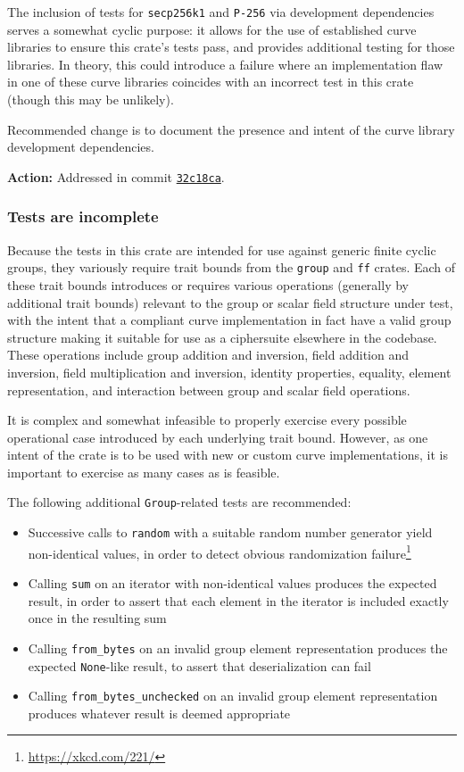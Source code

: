 \documentclass{article}
\begin{document}
The inclusion of tests for \texttt{secp256k1} and \texttt{P-256} via development dependencies serves a somewhat cyclic purpose: it allows for the use of established curve libraries to ensure this crate's tests pass, and provides additional testing for those libraries.
In theory, this could introduce a failure where an implementation flaw in one of these curve libraries coincides with an incorrect test in this crate (though this may be unlikely).

Recommended change is to document the presence and intent of the curve library development dependencies.

\textbf{Action:} Addressed in commit \href{https://github.com/serai-dex/serai/commit/32c18cac843b47d62f9946d053a59322f6e1fd9f}{\texttt{32c18ca}}.


\subsubsection{Tests are incomplete}

Because the tests in this crate are intended for use against generic finite cyclic groups, they variously require trait bounds from the \texttt{group} and \texttt{ff} crates.
Each of these trait bounds introduces or requires various operations (generally by additional trait bounds) relevant to the group or scalar field structure under test, with the intent that a compliant curve implementation in fact have a valid group structure making it suitable for use as a ciphersuite elsewhere in the codebase.
These operations include group addition and inversion, field addition and inversion, field multiplication and inversion, identity properties, equality, element representation, and interaction between group and scalar field operations.

It is complex and somewhat infeasible to properly exercise every possible operational case introduced by each underlying trait bound.
However, as one intent of the crate is to be used with new or custom curve implementations, it is important to exercise as many cases as is feasible.

The following additional \texttt{Group}-related tests are recommended:
\begin{itemize}
	\item Successive calls to \texttt{random} with a suitable random number generator yield non-identical values, in order to detect obvious randomization failure\footnote{\url{https://xkcd.com/221/}}
	\item Calling \texttt{sum} on an iterator with non-identical values produces the expected result, in order to assert that each element in the iterator is included exactly once in the resulting sum
	\item Calling \texttt{from\_bytes} on an invalid group element representation produces the expected \texttt{None}-like result, to assert that deserialization can fail
	\item Calling \texttt{from\_bytes\_unchecked} on an invalid group element representation produces whatever result is deemed appropriate
\end{itemize}
\end{document}

